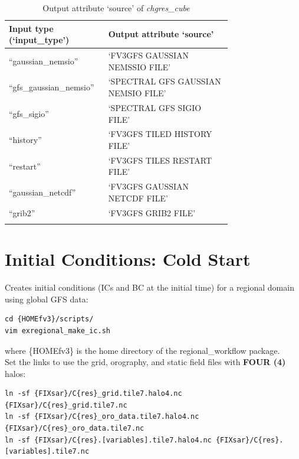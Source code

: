 \documentclass[11pt,fleqn]{report}              %
\begin{document}
{
\fontsize{10}{12}\selectfont
\begin{longtable}{p{0.25\linewidth} | p{0.5\linewidth} }
\hline
\hline
Input type (`input\_type') & Output attribute `source' \\
\hline
``gaussian\_nemsio'' & `FV3GFS GAUSSIAN NEMSSIO FILE' \\
``gfs\_gaussian\_nemsio'' & `SPECTRAL GFS GAUSSIAN NEMSIO FILE' \\
``gfs\_sigio'' & `SPECTRAL GFS SIGIO FILE' \\
``history'' & `FV3GFS TILED HISTORY FILE' \\
``restart'' & `FV3GFS TILES RESTART FILE' \\
``gaussian\_netcdf'' & `FV3GFS GAUSSIAN NETCDF FILE' \\
``grib2'' & `FV3GFS GRIB2 FILE' \\
\hline
\caption{Output attribute `source' of {\it chgres\_cube} }
\label{table:chgres_out_source}
\end{longtable}
}





\section{Initial Conditions: Cold Start}
\label{sec:glb2reg_cold}

Creates initial conditions (ICs and BC at the initial time) for a regional domain using global GFS data:
\lstset{language=bash}   
\begin{lstlisting}[frame=trBL]
cd {HOMEfv3}/scripts/
vim exregional_make_ic.sh
\end{lstlisting}
where \{HOMEfv3\} is the home directory of the regional\_workflow package. \\

Set the links to use the grid, orography, and static field files with {\bf FOUR (4)} halos:
\lstset{language=bash}   
\begin{lstlisting}[frame=trBL]
ln -sf {FIXsar}/C{res}_grid.tile7.halo4.nc {FIXsar}/C{res}_grid.tile7.nc
ln -sf {FIXsar}/C{res}_oro_data.tile7.halo4.nc {FIXsar}/C{res}_oro_data.tile7.nc
ln -sf {FIXsar}/C{res}.[variables].tile7.halo4.nc {FIXsar}/C{res}.[variables].tile7.nc
\end{lstlisting}
\end{document}
